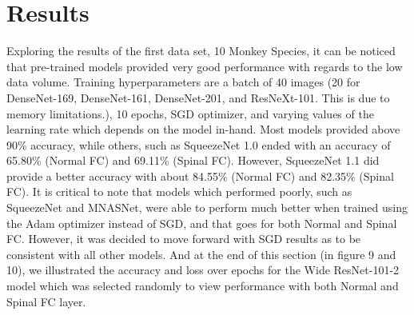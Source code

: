 \documentclass[conference]{IEEEtran}
\begin{document}
\section{Results}
Exploring the results of the first data set, 10 Monkey Species, it can be noticed that pre-trained models provided very good performance with regards to the low data volume. Training hyperparameters are a batch of 40 images (20 for DenseNet-169, DenseNet-161, DenseNet-201, and ResNeXt-101. This is due to memory limitations.), 10 epochs, SGD optimizer, and varying values of the learning rate which depends on the model in-hand. Most models provided above 90\% accuracy, while others, such as SqueezeNet 1.0 ended with an accuracy of 65.80\% (Normal FC) and 69.11\% (Spinal FC). However, SqueezeNet 1.1 did provide a better accuracy with about 84.55\% (Normal FC) and 82.35\% (Spinal FC). It is critical to note that models which performed poorly, such as SqueezeNet and MNASNet, were able to perform much better when trained using the Adam\cite{kingma2014adam} optimizer instead of SGD, and that goes for both Normal and Spinal FC. However, it was decided to move forward with SGD results as to be consistent with all other models. And at the end of this section (in figure 9 and 10), we illustrated the accuracy and loss over epochs for the Wide ResNet-101-2 model which was selected randomly to view performance with both Normal and Spinal FC layer.
\end{document}
